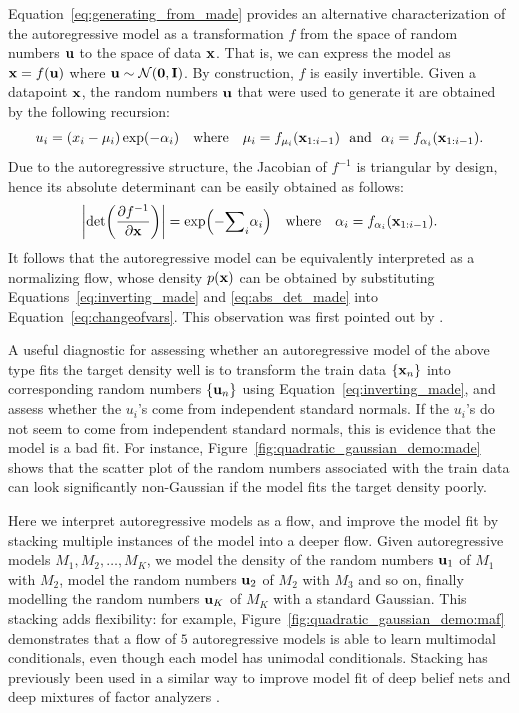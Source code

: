 Equation~\eqref{eq:generating_from_made} provides an alternative characterization of the autoregressive model as a transformation $f$ from the space of random numbers $\mathbf{u}$ to the space of data $\mathbf{x}$. That is, we can express the model as
$\mathbf{x} = f\mathopen{}\left(\mathbf{u}\right)\mathclose{}$
where
$\mathbf{u} \sim \mathcal{N}\mathopen{}\left(\mathbf{0},\mathbf{I}\right)\mathclose{}$.
By construction, $f$ is easily invertible. Given a datapoint $\mathbf{x}$, the random numbers $\mathbf{u}$ that were used to generate it are obtained by the following recursion:
\begin{equation}
\label{eq:inverting_made}
u_i = \mathopen{}\left(x_i-\mu_i\right)\mathclose{}\exp\mathopen{}\left(-\alpha_i\right)\mathclose{}
\quad\text{where}\quad
\mu_i = f_{\mu_i}\mathopen{}\left(\mathbf{x}_{1:i-1}\right)\mathclose{}
\,\,\,\,\text{and}\,\,\,\,
\alpha_i = f_{\alpha_i}\mathopen{}\left(\mathbf{x}_{1:i-1}\right)\mathclose{}.
\end{equation}
Due to the autoregressive structure, the Jacobian of $f^{-1}$ is triangular by design, hence its absolute determinant can be easily obtained as follows:
\begin{equation}
\label{eq:abs_det_made}
\left|\det\mathopen{}\left(\frac{\partial{f^{-1}}}{\partial{\mathbf{x}}}\right)\mathclose{}\right| = \exp\mathopen{}\left(-{\sum}_i\alpha_i\right)\mathclose{}
\quad\text{where}\quad
\alpha_i = f_{\alpha_i}\mathopen{}\left(\mathbf{x}_{1:i-1}\right)\mathclose{}.
\end{equation}
It follows that the autoregressive model can be equivalently interpreted as a normalizing flow, whose density $p\mathopen{}\left(\mathbf{x}\right)\mathclose{}$ can be obtained by substituting Equations~\eqref{eq:inverting_made} and \eqref{eq:abs_det_made} into Equation~\eqref{eq:changeofvars}. 
This observation was first pointed out by \citet{Kingma:2016}.

A useful diagnostic for assessing whether an autoregressive model of the above type fits the target density well is to transform the train data $\left\{\mathbf{x}_n\right\}$ into corresponding random numbers $\left\{\mathbf{u}_n\right\}$ using Equation~\eqref{eq:inverting_made}, and assess whether the $u_i$'s come from independent standard normals. If the $u_i$'s do not seem to come from independent standard normals, this is evidence that the model is a bad fit. For instance, Figure~\ref{fig:quadratic_gaussian_demo:made} shows that the scatter plot of the random numbers associated with the train data can look significantly non-Gaussian if the model fits the target density poorly.

Here we interpret autoregressive models as a flow, and improve the model fit by stacking multiple instances of the model into a deeper flow. Given autoregressive models $M_1, M_2, \ldots, M_K$, we model the density of the random numbers $\mathbf{u}_1$ of $M_1$ with $M_2$, model the random numbers $\mathbf{u}_2$ of $M_2$ with $M_3$ and so on, finally modelling the random numbers $\mathbf{u}_K$ of $M_K$ with a standard Gaussian. This stacking adds flexibility: for example, Figure~\ref{fig:quadratic_gaussian_demo:maf} demonstrates that a flow of $5$ autoregressive models is able to learn multimodal conditionals, even though each model has unimodal conditionals. Stacking has previously been used in a similar way to improve model fit of deep belief nets \cite{Hinton:2006} and deep mixtures of factor analyzers \cite{Tang:2012}.

